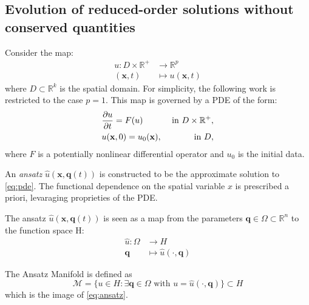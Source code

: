 \subsection{Evolution of reduced-order solutions without conserved quantities}

Consider the map:
\begin{equation}
    \begin{aligned}
        u: D\times \mathbb{R}^+ & \rightarrow \mathbb{R}^p \\
        (\mathbf{x}, t) & \mapsto u(\mathbf{x}, t)
    \end{aligned}
\end{equation}
where $D \subset \mathbb{R}^k$ is the spatial domain. 
For simplicity, the following work is restricted to the case $p=1$.
This map is governed by a PDE of the form:
\begin{equation}
    \label{eq:pde}
    \begin{aligned}
        & \frac{\partial u}{\partial t} = F(u) & \text{ in } D\times \mathbb{R}^+  , \\
        & u(\mathbf{x}, 0) = u_0(\mathbf{x}),  & \text{ in } D,
    \end{aligned}
\end{equation}
where $F$ is a potentially nonlinear differential operator and $u_0$ is the initial data.

An \textit{ansatz} $\hat{u}(\mathbf{x}, \mathbf{q}(t))$ is constructed to be the approximate solution to \eqref{eq:pde}. 
The functional dependence on the spatial variable $x$ is prescribed a priori, levaraging proprieties of the PDE. 


The ansatz $\hat{u}(\mathbf{x}, \mathbf{q}(t))$ is seen as a map from the parameters $\mathbf{q}\in \Omega \subset \mathbb{R}^n$ to the function space H:
\begin{equation}
    \label{eq:ansatz}
    \begin{aligned}
        \hat{u} : \Omega & \rightarrow H \\
        \mathbf{q} & \mapsto \hat{u}(\cdot, \mathbf{q})
    \end{aligned}
\end{equation}

\begin{defs}
    The Ansatz Manifold is defined as 
    \begin{equation}
        \mathcal{M} = \{ u \in H : \exists \mathbf{q} \in \Omega \text{ with } u = \hat{u}(\cdot , \mathbf{q})  \} \subset H
    \end{equation}
    which is the image of \eqref{eq:ansatz}.
\end{defs}

